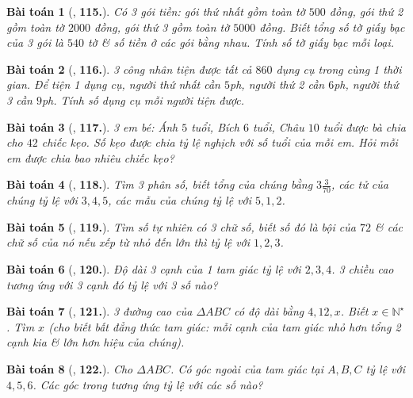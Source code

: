 \documentclass{article}
\numberwithin{equation}{section}
\newtheorem{baitoan}{Bài toán}
\begin{document}
\begin{baitoan}[\cite{Binh_Toan_7_tap_1}, \textbf{115.}]
	Có 3 gói tiền: gói thứ nhất gồm toàn tờ $500$ đồng, gói thứ 2 gồm toàn tờ $2000$ đồng, gói thứ 3 gồm toàn tờ $5000$ đồng. Biết tổng số tờ giấy bạc của 3 gói là $540$ tờ \& số tiền ở các gói bằng nhau. Tính số tờ giấy bạc mỗi loại.
\end{baitoan}

\begin{baitoan}[\cite{Binh_Toan_7_tap_1}, \textbf{116.}]
	3 công nhân tiện được tất cả $860$ dụng cụ trong cùng 1 thời gian. Để tiện 1 dụng cụ, người thứ nhất cần $5$\emph{ph}, người thứ 2 cần $6$\emph{ph}, người thứ 3 cần $9$\emph{ph}. Tính số dụng cụ mỗi người tiện được.
\end{baitoan}

\begin{baitoan}[\cite{Binh_Toan_7_tap_1}, \textbf{117.}]
	3 em bé: Ánh $5$ tuổi, Bích $6$ tuổi, Châu $10$ tuổi được bà chia cho $42$ chiếc kẹo. Số kẹo được chia tỷ lệ nghịch với số tuổi của mỗi em. Hỏi mỗi em được chia bao nhiêu chiếc kẹo?
\end{baitoan}

\begin{baitoan}[\cite{Binh_Toan_7_tap_1}, \textbf{118.}]
	Tìm 3 phân số, biết tổng của chúng bằng $3\frac{3}{70}$, các tử của chúng tỷ lệ với $3,4,5$, các mẫu của chúng tỷ lệ với $5,1,2$.
\end{baitoan}

\begin{baitoan}[\cite{Binh_Toan_7_tap_1}, \textbf{119.}]
	Tìm số tự nhiên có 3 chữ số, biết số đó là bội của $72$ \& các chữ số của nó nếu xếp từ nhỏ đến lớn thì tỷ lệ với $1,2,3$.
\end{baitoan}

\begin{baitoan}[\cite{Binh_Toan_7_tap_1}, \textbf{120.}]
	Độ dài 3 cạnh của 1 tam giác tỷ lệ với $2,3,4$. 3 chiều cao tương ứng với 3 cạnh đó tỷ lệ với 3 số nào?
\end{baitoan}

\begin{baitoan}[\cite{Binh_Toan_7_tap_1}, \textbf{121.}]
	3 đường cao của $\Delta ABC$ có độ dài bằng $4,12,x$. Biết $x\in\mathbb{N}^\star$. Tìm $x$ (cho biết \emph{bất đẳng thức tam giác}: mỗi cạnh của tam giác nhỏ hơn tổng 2 cạnh kia \& lớn hơn hiệu của chúng).
\end{baitoan}

\begin{baitoan}[\cite{Binh_Toan_7_tap_1}, \textbf{122.}]
	Cho $\Delta ABC$. Có góc ngoài của tam giác tại $A,B,C$ tỷ lệ với $4,5,6$. Các góc trong tương ứng tỷ lệ với các số nào?
\end{baitoan}
\end{document}
